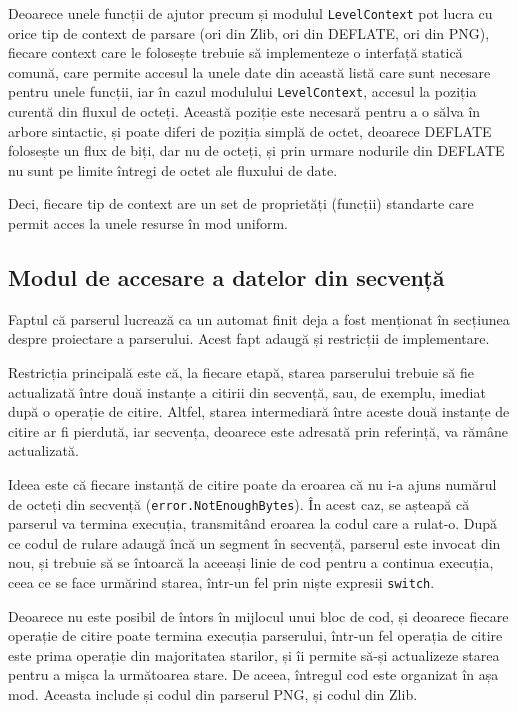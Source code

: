 \documentclass[a4paper,12pt]{report}
\begin{document}
Deoarece unele funcții de ajutor precum și modulul \texttt{LevelContext}
pot lucra cu orice tip de context de parsare (ori din Zlib, ori din DEFLATE, ori din \ac{PNG}),
fiecare context care le folosește trebuie să implementeze o interfață statică comună,
care permite accesul la unele date din această listă care sunt necesare pentru unele funcții,
iar în cazul modulului \texttt{LevelContext},
accesul la poziția curentă din fluxul de octeți.
Această poziție este necesară pentru a o sălva în arbore sintactic,
și poate diferi de poziția simplă de octet,
deoarece DEFLATE folosește un flux de biți, dar nu de octeți,
și prin urmare nodurile din DEFLATE nu sunt pe limite întregi de octet ale fluxului de date.

Deci, fiecare tip de context are un set de proprietăți (funcții) standarte
care permit acces la unele resurse în mod uniform.

\subsection{Modul de accesare a datelor din secvență}

Faptul că parserul lucrează ca un automat finit deja a fost
menționat în secțiunea despre proiectare a parserului.
Acest fapt adaugă și restricții de implementare.

Restricția principală este că, la fiecare etapă, starea parserului trebuie să fie actualizată
între două instanțe a citirii din secvență, sau, de exemplu, imediat după o operație de citire.
Altfel, starea intermediară între aceste două instanțe de citire ar fi pierdută,
iar secvența, deoarece este adresată prin referință, va rămâne actualizată.

Ideea este că fiecare instanță de citire poate da eroarea
că nu i-a ajuns numărul de octeți din secvență (\texttt{error.NotEnoughBytes}).
În acest caz, se așteapă că parserul va termina execuția,
transmitând eroarea la codul care a rulat-o.
După ce codul de rulare adaugă încă un segment în secvență,
parserul este invocat din nou, și trebuie să se întoarcă
la aceeași linie de cod pentru a continua execuția,
ceea ce se face urmărind starea, într-un fel prin niște expresii \texttt{switch}.

Deoarece nu este posibil de întors în mijlocul unui bloc de cod,
și deoarece fiecare operație de citire poate termina execuția parserului,
într-un fel operația de citire este prima operație din majoritatea starilor,
și îi permite să-și actualizeze starea pentru a mișca la următoarea stare.
De aceea, întregul cod este organizat în așa mod.
Aceasta include și codul din parserul \ac{PNG}, și codul din Zlib.
\end{document}
